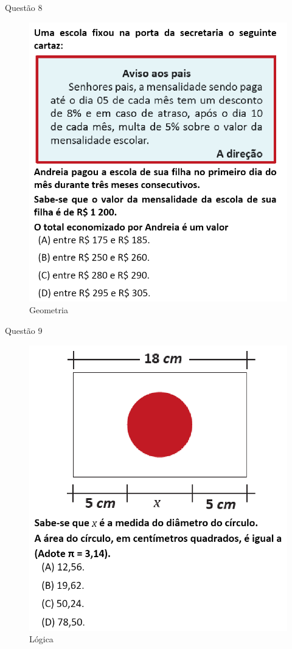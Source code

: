 \documentclass{beamer}
\begin{document}
\begin{frame}{Questão 8}
    \begin{figure}
        \caption{Geometria}
        \includegraphics[scale=0.45]{qst22.01.png}
    \end{figure}
\end{frame}
\begin{frame}{Questão 9}
    \begin{figure}
        \caption{Lógica}
        \includegraphics[scale=0.45]{qst22.31.png}
    \end{figure}
\end{frame}
\end{document}
